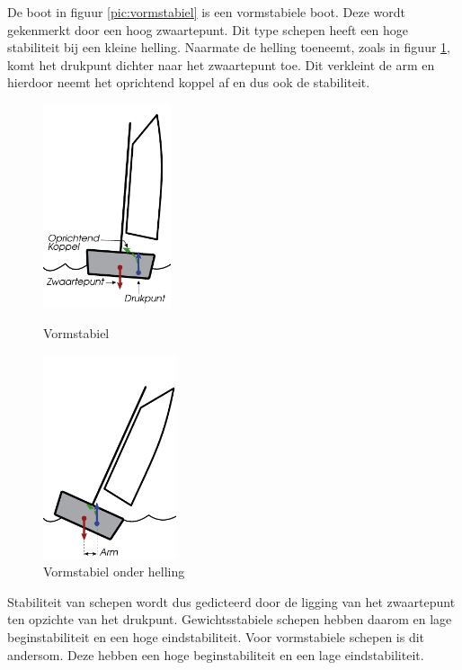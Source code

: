 De boot in figuur \ref{pic:vormstabiel} is een vormstabiele boot. Deze wordt gekenmerkt door een hoog zwaartepunt. Dit type schepen heeft een hoge stabiliteit bij een kleine helling. Naarmate de helling toeneemt, zoals in figuur \ref{pic:vormstabiel_helling}, komt het drukpunt dichter naar het zwaartepunt toe. Dit verkleint de arm en hierdoor neemt het oprichtend koppel af en dus ook de stabiliteit.
\begin{figure}[H]
	\centering
	\begin{minipage}[b]{0.49\textwidth}
		\centering
		\includegraphics[height=6cm]{Hoofdstukken/Krachten/pdf/stabiliteit_vormstabiel.pdf}
		\caption{Vormstabiel}
		\label{pic:vormstabiel}
	\end{minipage}
	\hfill
	\begin{minipage}[b]{0.49\textwidth}
		\centering
		\includegraphics[height=6cm]{Hoofdstukken/Krachten/pdf/stabiliteit_vormstabiel_helling.pdf}
		\caption{Vormstabiel onder helling}
		\label{pic:vormstabiel_helling}
	\end{minipage}
\end{figure}

Stabiliteit van schepen wordt dus gedicteerd door de ligging van het zwaartepunt ten opzichte van het drukpunt. Gewichtsstabiele schepen hebben daarom en lage beginstabiliteit en een hoge eindstabiliteit. Voor vormstabiele schepen is dit andersom. Deze hebben een hoge beginstabiliteit en een lage eindstabiliteit.  

